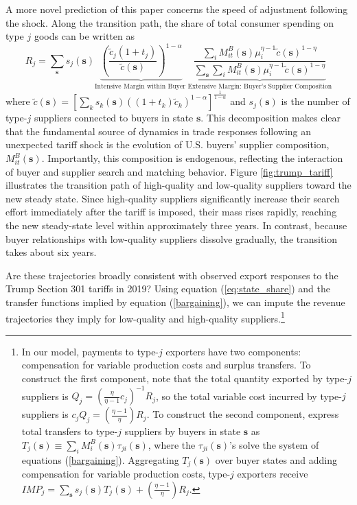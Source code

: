 \documentclass[12pt]{article} \usepackage{amsmath,amssymb,amsthm,geometry,graphicx,setspace,algorithm,algpseudocode,float}
\begin{document}
A more novel prediction of this paper concerns the speed of adjustment following the shock. Along the transition path, the share of total consumer spending on type $j$ goods can be written as
\begin{equation}
R_j=
   \sum_{\mathbf{s}} s_j(\mathbf{s}) \underbrace{\left(\frac{\tilde{c}_j(1+t_j)}{\tilde{c}(\mathbf{s})}\right)^{1-\alpha}}_{\text{Intensive Margin within Buyer }}\underbrace{\frac{\sum_{i}M_{it}^B(\mathbf{s}) \mu_i^{\eta-1} \tilde{c}(\mathbf{s})^{1-\eta}}{\sum_{\mathbf{s}}\sum_{i}M_{it}^B(\mathbf{s})\mu_i^{\eta-1}\tilde{c}(\mathbf{s})^{1-\eta}}}_{\text{Extensive Margin: Buyer's Supplier Composition}}
   \label{eq:state_share}
\end{equation}
where $\tilde{c}(\mathbf{s}) = \left[\sum_{k}s_k(\mathbf{s}) \left((1+t_k)\tilde{c}_k\right)^{1-\alpha}\right]^{\frac{1}{1-\alpha}}$ and $s_j(\mathbf{s})$ is the number of type-$j$ suppliers connected to buyers in state $\mathbf{s}$. This decomposition makes clear that the fundamental source of dynamics in trade responses following an unexpected tariff shock is the evolution of U.S. buyers’ supplier composition, $M_{it}^B(\mathbf{s})$. Importantly, this composition is endogenous, reflecting the interaction of buyer and supplier search and matching behavior. Figure \ref{fig:trump_tariff} illustrates the transition path of high-quality and low-quality suppliers toward the new steady state. Since high-quality suppliers significantly increase their search effort immediately after the tariff is imposed, their mass rises rapidly, reaching the new steady-state level within approximately three years. In contrast, because buyer relationships with low-quality suppliers dissolve gradually, the transition takes about six years. %
\par
Are these trajectories broadly consistent with observed export responses to the Trump Section 301 tariffs in 2019? Using equation (\ref{eq:state_share}) and the transfer functions implied by equation (\ref{bargaining}), we can impute the revenue trajectories they imply for low-quality and high-quality suppliers.\footnote
{\label{fn:IMP} In our model, payments to type-$j$ exporters have two components: compensation for variable production costs and surplus transfers. To construct the first component, note that  the total quantity exported by type-$j$ suppliers is $Q_j = (\frac{\eta}{\eta-1} c_j)^{-1} R_j$,  so the total variable cost incurred by type-$j$ suppliers is $c_jQ_j=(\frac{\eta-1}{\eta} ) R_j$. To construct the second component, express total transfers to type-$j$ suppliers by buyers in state $\mathbf{s}$ as $T_j(\mathbf{s}) \equiv \sum_i M_i^B(\mathbf{s})\tau_{ji}(\mathbf{s})$, where the $\tau_{ji}(\mathbf{s})$'s solve the system of equations (\ref{bargaining}). Aggregating $T_j(\mathbf{s})$ over buyer states and adding compensation for variable production costs,  type-$j$ exporters receive $
  IMP_j =  \sum_{\mathbf{s}} s_j(\mathbf{s}) T_j(\mathbf{s}) +(\frac{\eta-1}{\eta} ) R_j.$\medskip
}
\end{document}
